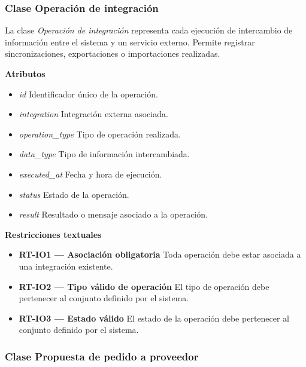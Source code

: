 \subsubsection{Clase Operación de integración}

La clase \textit{Operación de integración} representa cada ejecución de intercambio de información entre el sistema y un servicio externo. Permite registrar sincronizaciones, exportaciones o importaciones realizadas.

\textbf{Atributos}

\begin{itemize}

      \item \textit{id}
            Identificador único de la operación.
      \item \textit{integration}
            Integración externa asociada.
      \item \textit{operation\_type}
            Tipo de operación realizada.
      \item \textit{data\_type}
            Tipo de información intercambiada.
      \item \textit{executed\_at}
            Fecha y hora de ejecución.
      \item \textit{status}
            Estado de la operación.
      \item \textit{result}
            Resultado o mensaje asociado a la operación.

\end{itemize}

\textbf{Restricciones textuales}

\begin{itemize}

      \item \textbf{RT-IO1 — Asociación obligatoria}
            Toda operación debe estar asociada a una integración existente.
      \item \textbf{RT-IO2 — Tipo válido de operación}
            El tipo de operación debe pertenecer al conjunto definido por el sistema.
      \item \textbf{RT-IO3 — Estado válido}
            El estado de la operación debe pertenecer al conjunto definido por el sistema.

\end{itemize}

\subsubsection{Clase Propuesta de pedido a proveedor}

